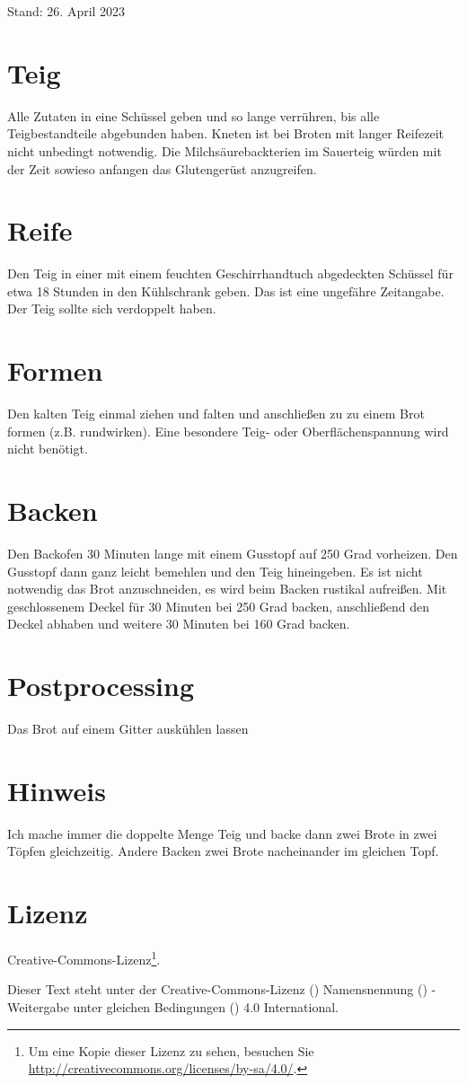 \documentclass[a4paper, oneside]{recipe}
\begin{document}
Stand: 26. April 2023

\section*{Teig}
Alle Zutaten in eine Schüssel geben und so lange verrühren, bis alle Teigbestandteile abgebunden haben. Kneten ist bei Broten mit langer Reifezeit nicht unbedingt notwendig. Die Milchsäurebackterien im Sauerteig würden mit der Zeit sowieso anfangen das Glutengerüst anzugreifen.

\section*{Reife}
Den Teig in einer mit einem feuchten Geschirrhandtuch abgedeckten Schüssel für etwa 18 Stunden in den Kühlschrank geben. Das ist eine ungefähre Zeitangabe. Der Teig sollte sich verdoppelt haben.

\section*{Formen}
Den kalten Teig einmal ziehen und falten und anschließen zu zu einem Brot formen (z.B. rundwirken). Eine besondere Teig- oder Oberflächenspannung wird nicht benötigt.

\section*{Backen}
Den Backofen 30 Minuten lange mit einem Gusstopf auf 250 Grad vorheizen. Den Gusstopf dann ganz leicht bemehlen und den Teig hineingeben. Es ist nicht notwendig das Brot anzuschneiden, es wird beim Backen rustikal aufreißen. Mit geschlossenem Deckel für 30 Minuten bei 250 Grad backen, anschließend den Deckel abhaben und weitere 30 Minuten bei 160 Grad backen.

\section*{Postprocessing}
Das Brot auf einem Gitter auskühlen lassen

\section*{Hinweis}
Ich mache immer die doppelte Menge Teig und backe dann zwei Brote in zwei Töpfen gleichzeitig. Andere Backen zwei Brote nacheinander im gleichen Topf.




\section*{Lizenz}
\ccbysa{} Creative-Commons-Lizenz\footnote{Um eine Kopie dieser Lizenz zu sehen, besuchen Sie \url{http://creativecommons.org/licenses/by-sa/4.0/}.}.

Dieser Text steht unter der Creative-Commons-Lizenz (\ccLogo) Namensnennung (\ccAttribution) - Weitergabe unter gleichen Bedingungen (\ccShareAlike) 4.0 International. 
\end{document}
